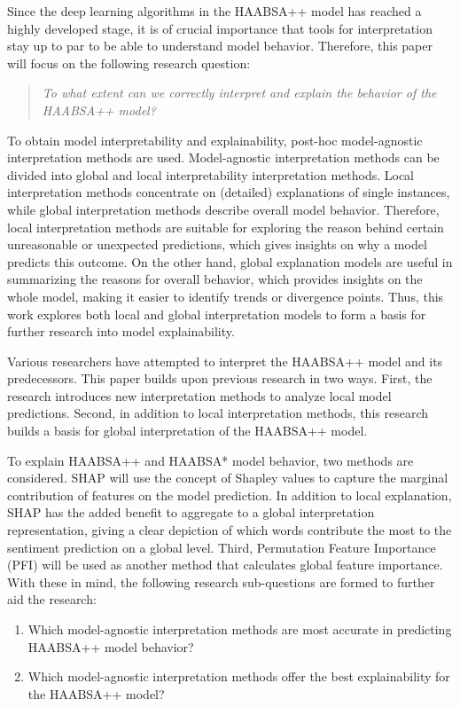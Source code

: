 Since the deep learning algorithms in the HAABSA++ model has reached a highly developed stage, it is of crucial importance that tools for interpretation stay up to par to be able to understand model behavior. Therefore, this paper will focus on the following research question:

\begin{quote}
\emph{To what extent can we correctly interpret and explain the behavior of the HAABSA++ model?}
\end{quote}

To obtain model interpretability and explainability, post-hoc model-agnostic interpretation methods are used. Model-agnostic interpretation methods can be divided into global and local interpretability interpretation methods. Local interpretation methods concentrate on (detailed) explanations of single instances, while global interpretation methods describe overall model behavior. Therefore, local interpretation methods are suitable for exploring the reason behind certain unreasonable or unexpected predictions, which gives insights on why a model predicts this outcome. On the other hand, global explanation models are useful in summarizing the reasons for overall behavior, which provides insights on the whole model, making it easier to identify trends or divergence points. Thus, this work explores both local and global interpretation models to form a basis for further research into model explainability.

Various researchers have attempted to interpret the HAABSA++ model and its predecessors. This paper builds upon previous research in two ways. First, the research introduces new interpretation methods to analyze local model predictions. Second, in addition to local interpretation methods, this research builds a basis for global interpretation of the HAABSA++ model. 

To explain HAABSA++ and HAABSA* model behavior, two methods are considered. SHAP will use the concept of Shapley values to capture the marginal contribution of features on the model prediction. In addition to local explanation, SHAP has the added benefit to aggregate to a global interpretation representation, giving a clear depiction of which words contribute the most to the sentiment prediction on a global level. Third, Permutation Feature Importance (PFI) will be used as another method that calculates global feature importance. With these in mind, the following research sub-questions are formed to further aid the research:

\begin{enumerate}
    \item{Which model-agnostic interpretation methods are most accurate in predicting HAABSA++ model behavior?}
    \item{Which model-agnostic interpretation methods offer the best explainability for the HAABSA++ model?}
\end{enumerate}